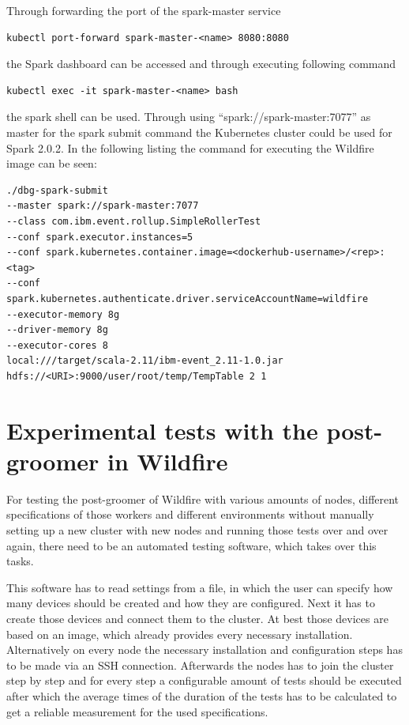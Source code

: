 Through forwarding the port of the spark-master service 
\begin{lstlisting}[caption={Forward spark-master service pod},captionpos=b]
kubectl port-forward spark-master-<name> 8080:8080
\end{lstlisting}
the Spark dashboard can be accessed and through executing following command
\begin{lstlisting}[caption={Access spark shell},captionpos=b]
kubectl exec -it spark-master-<name> bash
\end{lstlisting}
the spark shell can be used. Through using ``spark://spark-master:7077'' as master for the spark submit command the Kubernetes cluster could be used for Spark 2.0.2. In the following listing the command for executing the Wildfire image can be seen:
\begin{lstlisting}[caption={Execute Wildfire image with Kubernetes},captionpos=b]
./dbg-spark-submit 
--master spark://spark-master:7077 
--class com.ibm.event.rollup.SimpleRollerTest 
--conf spark.executor.instances=5 
--conf spark.kubernetes.container.image=<dockerhub-username>/<rep>:<tag> 
--conf spark.kubernetes.authenticate.driver.serviceAccountName=wildfire 
--executor-memory 8g 
--driver-memory 8g 
--executor-cores 8 
local:///target/scala-2.11/ibm-event_2.11-1.0.jar 
hdfs://<URI>:9000/user/root/temp/TempTable 2 1
\end{lstlisting}

\section{Experimental tests with the post-groomer in Wildfire}

For testing the post-groomer of Wildfire with various amounts of nodes, different specifications of those workers and different environments without manually setting up a new cluster with new nodes and running those tests over and over again, there need to be an automated testing software, which takes over this tasks. 

This software has to read settings from a file, in which the user can specify how many devices should be created and how they are configured. Next it has to create those devices and connect them to the cluster. At best those devices are based on an image, which already provides every necessary installation. Alternatively on every node the necessary installation and configuration steps has to be made via an SSH connection. Afterwards the nodes has to join the cluster step by step and for every step a configurable amount of tests should be executed after which the average times of the duration of the tests has to be calculated to get a reliable measurement for the used specifications.

